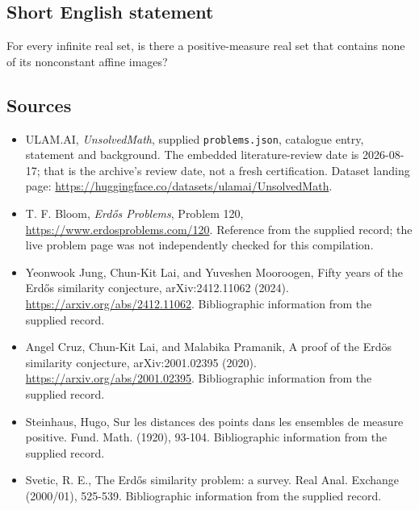 \documentclass[11pt,a4paper]{article}
\begin{document}
\subsection{Short English statement}

For every infinite real set, is there a positive-measure real set that contains none of its nonconstant affine images?

\subsection{Sources}

{\small

\begin{itemize}

\item[\hypertarget{source:statement:1}{S1}] ULAM.AI, \emph{UnsolvedMath}, supplied \texttt{problems.json}, catalogue entry, statement and background. The embedded literature-review date is 2026-08-17; that is the archive’s review date, not a fresh certification. Dataset landing page: \url{https://huggingface.co/datasets/ulamai/UnsolvedMath}.

\item[\hypertarget{source:statement:2}{S2}] T. F. Bloom, \emph{Erdős Problems}, Problem 120, \url{https://www.erdosproblems.com/120}. Reference from the supplied record; the live problem page was not independently checked for this compilation.

\item[\hypertarget{source:statement:3}{S3}] Yeonwook Jung, Chun-Kit Lai, and Yuveshen Mooroogen, Fifty years of the Erdős similarity conjecture, arXiv:2412.11062 (2024). \url{https://arxiv.org/abs/2412.11062}. Bibliographic information from the supplied record.

\item[\hypertarget{source:statement:4}{S4}] Angel Cruz, Chun-Kit Lai, and Malabika Pramanik, A proof of the Erdös similarity conjecture, arXiv:2001.02395 (2020). \url{https://arxiv.org/abs/2001.02395}. Bibliographic information from the supplied record.

\item[\hypertarget{source:statement:5}{S5}] Steinhaus, Hugo, Sur les distances des points dans les ensembles de measure positive. Fund. Math. (1920), 93-104. Bibliographic information from the supplied record.

\item[\hypertarget{source:statement:6}{S6}] Svetic, R. E., The Erd\H{o}s similarity problem: a survey. Real Anal. Exchange (2000/01), 525-539. Bibliographic information from the supplied record.

\end{itemize}

}

\label{end:statement}
\end{document}
